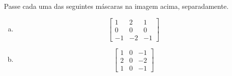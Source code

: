 \documentclass[12pt]{article}
\begin{document}
Passe cada uma das seguintes máscaras na imagem acima, separadamente.

\begin{enumerate}[a)]

\item

\[
\begin{bmatrix}
 1 &  2 &  1\\
 0 &  0 &  0\\
-1 & -2 & -1
\end{bmatrix}
\]

\item

\[
\begin{bmatrix}
 1 &  0 & -1\\
 2 &  0 & -2\\
 1 &  0 & -1
\end{bmatrix}
\]

\end{enumerate}
\end{document}
